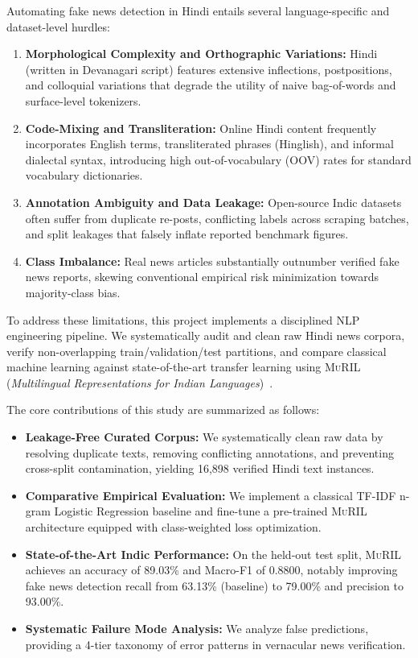 \documentclass[11pt,a4paper]{article}
\begin{document}
Automating fake news detection in Hindi entails several language-specific and dataset-level hurdles:
\begin{enumerate}[leftmargin=*]
    \item \textbf{Morphological Complexity and Orthographic Variations:} Hindi (written in Devanagari script) features extensive inflections, postpositions, and colloquial variations that degrade the utility of naive bag-of-words and surface-level tokenizers.
    \item \textbf{Code-Mixing and Transliteration:} Online Hindi content frequently incorporates English terms, transliterated phrases (Hinglish), and informal dialectal syntax, introducing high out-of-vocabulary (OOV) rates for standard vocabulary dictionaries.
    \item \textbf{Annotation Ambiguity and Data Leakage:} Open-source Indic datasets often suffer from duplicate re-posts, conflicting labels across scraping batches, and split leakages that falsely inflate reported benchmark figures.
    \item \textbf{Class Imbalance:} Real news articles substantially outnumber verified fake news reports, skewing conventional empirical risk minimization towards majority-class bias.
\end{enumerate}

To address these limitations, this project implements a disciplined NLP engineering pipeline. We systematically audit and clean raw Hindi news corpora, verify non-overlapping train/validation/test partitions, and compare classical machine learning against state-of-the-art transfer learning using \textsc{MuRIL} (\textit{Multilingual Representations for Indian Languages})~\cite{khanuja2021muril}.

The core contributions of this study are summarized as follows:
\begin{itemize}[leftmargin=*]
    \item \textbf{Leakage-Free Curated Corpus:} We systematically clean raw data by resolving duplicate texts, removing conflicting annotations, and preventing cross-split contamination, yielding 16,898 verified Hindi text instances.
    \item \textbf{Comparative Empirical Evaluation:} We implement a classical TF-IDF n-gram Logistic Regression baseline and fine-tune a pre-trained \textsc{MuRIL} architecture equipped with class-weighted loss optimization.
    \item \textbf{State-of-the-Art Indic Performance:} On the held-out test split, \textsc{MuRIL} achieves an accuracy of 89.03\% and Macro-F1 of 0.8800, notably improving fake news detection recall from 63.13\% (baseline) to 79.00\% and precision to 93.00\%.
    \item \textbf{Systematic Failure Mode Analysis:} We analyze false predictions, providing a 4-tier taxonomy of error patterns in vernacular news verification.
\end{itemize}
\end{document}
